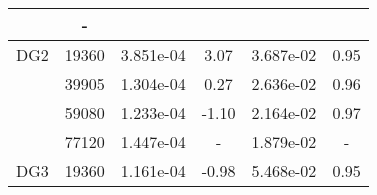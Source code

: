 \begin{table}
\begin{center}
{\begin{tabular}{| l | c | c | c | c | c |}
                &-\\
                \hline
        \hline
        \hspace{0.1cm}DG2\hspace{0.1cm}    
        
            &19360
            
                &3.851e-04
                
                &3.07
                
                &3.687e-02
                
                &0.95\\
                
            &39905
            
                &1.304e-04
                
                &0.27
                
                &2.636e-02
                
                &0.96\\
                
            &59080
            
                &1.233e-04
                
                &-1.10
                
                &2.164e-02
                
                &0.97\\
                
            &77120
            
                &1.447e-04
                
                &-
                
                &1.879e-02
                
                &-\\
                \hline
        \hline
        \hspace{0.1cm}DG3\hspace{0.1cm}    
        
            &19360
            
                &1.161e-04
                
                &-0.98
                
                &5.468e-02
                
                &0.95\\
                

\end{tabular}}
\end{center}
\end{table}
